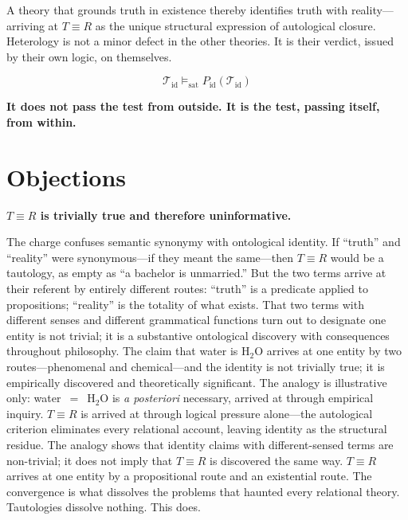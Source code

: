 \documentclass[11pt, oneside]{article}
\newcommand{\verdict}[1]{%
    \vspace{10pt}%
    \begin{center}\textcolor{LogosGold}{\textbf{#1}}\end{center}%
    \vspace{10pt}%
}
\begin{document}
A theory that grounds truth in existence thereby identifies truth with
reality---arriving at $T \equiv R$ as the unique structural expression
of autological closure. Heterology is not a minor defect in the other theories. It is
their verdict, issued by their own logic, on themselves.

\[
\mathcal{T}_{\mathrm{id}} \models_{\mathrm{sat}}
P_{\mathrm{id}}(\mathcal{T}_{\mathrm{id}}) \tag{AC}
\]

\verdict{It does not pass the test from outside. It is the test, passing itself, from within.}

\section{Objections}

\noindent\textbf{$T \equiv R$ is trivially true and therefore
uninformative.}

\medskip\noindent
The charge confuses semantic synonymy with ontological identity. If
``truth'' and ``reality'' were synonymous---if they meant the same---then
$T \equiv R$ would be a tautology, as empty as ``a bachelor is
unmarried.'' But the two terms arrive at their referent by entirely
different routes: ``truth'' is a predicate applied to propositions;
``reality'' is the totality of what exists. That two terms with different
senses and different grammatical functions turn out to designate one
entity is not trivial; it is a substantive ontological discovery
with consequences throughout philosophy. The claim
that water is H$_{2}$O arrives at one entity by two routes---phenomenal
and chemical---and the identity is not trivially true; it is empirically
discovered and theoretically significant. The analogy is illustrative
only: water~$=$~H$_{2}$O is \textit{a posteriori} necessary, arrived at
through empirical inquiry. $T \equiv R$ is arrived at through logical
pressure alone---the autological criterion eliminates every relational
account, leaving identity as the structural residue. The analogy shows
that identity claims with different-sensed terms are non-trivial; it does
not imply that $T \equiv R$ is discovered the same way. $T \equiv R$
arrives at one entity by a propositional route and an existential route.
The convergence is what dissolves the problems that haunted every
relational theory. Tautologies dissolve nothing. This does.
\end{document}

